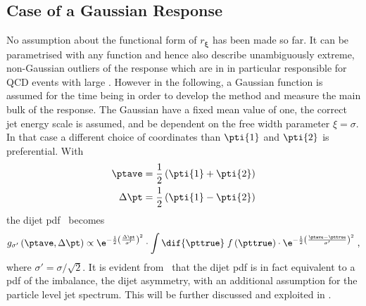 \subsection{Case of a Gaussian Response}

No assumption about the functional form of $r_{\mathbf{\xi}}$ has been
made so far.
It can be parametrised with any function and hence also
describe unambiguously extreme, non-Gaussian outliers of the response which are in
in particular responsible for QCD events with large \met.
However in the following, a Gaussian function is assumed for the time
being in order to develop the method and measure the main bulk of the
response.
The Gaussian have a fixed mean value of one, \ie the
correct jet energy scale is assumed, and be dependent on the free width
parameter \mbox{$\mathcal{\xi} = \sigma$}.
In that case a different choice of coordinates than $\pti{1}$ and
$\pti{2}$ is preferential.
With
\begin{align}
  \label{eq:ResFit:TransformedCoordinates}
  \begin{split}
    \ptave     &  = \frac{1}{2}\left(\pti{1}+\pti{2}\right) \\
    \Delta\pt  &  = \frac{1}{2}\left(\pti{1}-\pti{2}\right)
  \end{split}
\end{align} 
the dijet pdf~ becomes
\begin{equation}
  \label{eq:ResFit:DijetPdfTransformed}
   g_{\sigma'}\left(\ptave,\Delta\pt\right) \propto
   \e^{-\frac{1}{2}\left(\frac{\Delta\pt}{\sigma'}\right)^{2}}\cdot
   \int\dif{\pttrue}\;f\left(\pttrue\right)\cdot
   \e^{-\frac{1}{2}\left(\frac{\ptave - \pttrue}{\sigma'}\right)^{2}}
   \; ,
\end{equation}
where \mbox{$\sigma' = \sigma/\sqrt{2}$}.
It is evident from~ that the dijet
pdf is in fact equivalent to a pdf of the \pt imbalance, \ie the dijet
asymmetry, with an additional assumption for the particle level jet
\pt spectrum.
This will be further discussed and exploited in .
